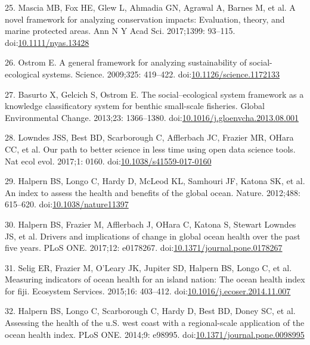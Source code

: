 \documentclass[12pt,]{article}
\begin{document}
\hypertarget{ref-mascia_2017-m_}{}
25. Mascia MB, Fox HE, Glew L, Ahmadia GN, Agrawal A, Barnes M, et al. A
novel framework for analyzing conservation impacts: Evaluation, theory,
and marine protected areas. Ann N Y Acad Sci. 2017;1399: 93--115.
doi:\href{https://doi.org/10.1111/nyas.13428}{10.1111/nyas.13428}

\hypertarget{ref-ostrom_2009-hg}{}
26. Ostrom E. A general framework for analyzing sustainability of
social-ecological systems. Science. 2009;325: 419--422.
doi:\href{https://doi.org/10.1126/science.1172133}{10.1126/science.1172133}

\hypertarget{ref-basurto_2013-oq}{}
27. Basurto X, Gelcich S, Ostrom E. The social--ecological system
framework as a knowledge classificatory system for benthic small-scale
fisheries. Global Environmental Change. 2013;23: 1366--1380.
doi:\href{https://doi.org/10.1016/j.gloenvcha.2013.08.001}{10.1016/j.gloenvcha.2013.08.001}

\hypertarget{ref-lowndes_2017-xh}{}
28. Lowndes JSS, Best BD, Scarborough C, Afflerbach JC, Frazier MR,
OHara CC, et al. Our path to better science in less time using open data
science tools. Nat ecol evol. 2017;1: 0160.
doi:\href{https://doi.org/10.1038/s41559-017-0160}{10.1038/s41559-017-0160}

\hypertarget{ref-halpern_2012-k9}{}
29. Halpern BS, Longo C, Hardy D, McLeod KL, Samhouri JF, Katona SK, et
al. An index to assess the health and benefits of the global ocean.
Nature. 2012;488: 615--620.
doi:\href{https://doi.org/10.1038/nature11397}{10.1038/nature11397}

\hypertarget{ref-halpern_2017-Zi}{}
30. Halpern BS, Frazier M, Afflerbach J, OHara C, Katona S, Stewart
Lowndes JS, et al. Drivers and implications of change in global ocean
health over the past five years. PLoS ONE. 2017;12: e0178267.
doi:\href{https://doi.org/10.1371/journal.pone.0178267}{10.1371/journal.pone.0178267}

\hypertarget{ref-selig_2015-F9}{}
31. Selig ER, Frazier M, O'Leary JK, Jupiter SD, Halpern BS, Longo C, et
al. Measuring indicators of ocean health for an island nation: The ocean
health index for fiji. Ecosystem Services. 2015;16: 403--412.
doi:\href{https://doi.org/10.1016/j.ecoser.2014.11.007}{10.1016/j.ecoser.2014.11.007}

\hypertarget{ref-halpern_2014-lQ}{}
32. Halpern BS, Longo C, Scarborough C, Hardy D, Best BD, Doney SC, et
al. Assessing the health of the u.S. west coast with a regional-scale
application of the ocean health index. PLoS ONE. 2014;9: e98995.
doi:\href{https://doi.org/10.1371/journal.pone.0098995}{10.1371/journal.pone.0098995}
\end{document}
